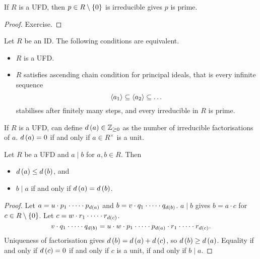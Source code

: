 \begin{lemma}
If $ R $ is a UFD, then $ p \in R \setminus \left\{ 0 \right\} $ is irreducible gives $ p $ is prime.
\end{lemma}

\begin{proof}
Exercise.
\end{proof}

\begin{theorem}
\label{thm:ufd}
Let $ R $ be an ID. The following conditions are equivalent.
\begin{itemize}
\item $ R $ is a UFD.
\item $ R $ satisfies ascending chain condition for principal ideals, that is every infinite sequence
$$ \left\langle a_1 \right\rangle \subseteq \left\langle a_2 \right\rangle \subseteq \dots $$
stabilises after finitely many steps, and every irreducible in $ R $ is prime.
\end{itemize}
\end{theorem}

If $ R $ is a UFD, can define $ d\left( a \right) \in \mathbb{Z}_{\ge 0} $ as the number of irreducible factorisations of $ a $. $ d\left( a \right) = 0 $ if and only if $ a \in R^\times $ is a unit.

\begin{lemma}
Let $ R $ be a UFD and $ a \mid b $ for $ a, b \in R $. Then
\begin{itemize}
\item $ d\left( a \right) \le d\left( b \right) $, and
\item $ b \mid a $ if and only if $ d\left( a \right) = d\left( b \right) $.
\end{itemize}
\end{lemma}


\begin{proof}
Let $ a = u \cdot p_1 \cdot \dots \cdot p_{d\left( a \right)} $ and $ b = v \cdot q_1 \cdot \dots \cdot q_{d\left( b \right)} $. $ a \mid b $ gives $ b = a \cdot c $ for $ c \in R \setminus \left\{ 0 \right\} $. Let $ c = w \cdot r_1 \cdot \dots \cdot r_{d\left( c \right)} $.
$$ v \cdot q_1 \cdot \dots \cdot q_{d\left( b \right)} = u \cdot w \cdot p_1 \cdot \dots \cdot p_{d\left( a \right)} \cdot r_1 \cdot \dots \cdot r_{d\left( c \right)}. $$
Uniqueness of factorisation gives $ d\left( b \right) = d\left( a \right) + d\left( c \right) $, so $ d\left( b \right) \ge d\left( a \right) $. Equality if and only if $ d\left( c \right) = 0 $ if and only if $ c $ is a unit, if and only if $ b \mid a $.
\end{proof}

